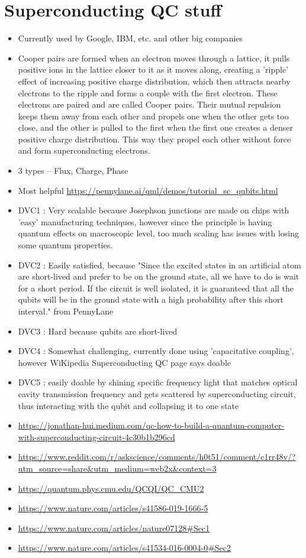 \section{Superconducting QC stuff}

\begin{itemize}
    \item Currently used by Google, IBM, etc. and other big companies
    \item Cooper pairs are formed when an electron moves through a lattice, it pulls positive ions in the lattice closer to it as it moves along, creating a 'ripple' effect of increasing positive charge distribution, which then attracts nearby electrons to the ripple and forms a couple with the first electron. These electrons are paired and are called Cooper pairs. Their mutual repulsion keeps them away from each other and propels one when the other gets too close, and the other is pulled to the first when the first one creates a denser positive charge distribution. This way they propel each other without force and form superconducting electrons. 
    \item 3 types – Flux, Charge, Phase
    \item Most helpful \url{https://pennylane.ai/qml/demos/tutorial_sc_qubits.html}
    \item DVC1 : Very scalable because Josephson junctions are made on chips with 'easy' manufacturing techniques, however since the principle is having quantum effects on macroscopic level, too much scaling has issues with losing some quantum properties.
    \item DVC2 : Easily satisfied, because "Since the excited states in an artificial atom are short-lived and prefer to be on the ground state, all we have to do is wait for a short period. If the circuit is well isolated, it is guaranteed that all the qubits will be in the ground state with a high probability after this short interval." from PennyLane
    \item DVC3 : Hard because qubits are short-lived
    \item DVC4 : Somewhat challenging, currently done using 'capacitative coupling', however WiKipedia Superconducting QC page says doable
    \item DVC5 : easily doable by shining specific frequency light that matches optical cavity transmission frequency and gets scattered by superconducting circuit, thus interacting with the qubit and collapsing it to one state
    \item 
    \url{https://jonathan-hui.medium.com/qc-how-to-build-a-quantum-computer-with-superconducting-circuit-4c30b1b296cd}
    \item 
    \url{https://www.reddit.com/r/askscience/comments/h0t51/comment/c1rr48v/?utm_source=share&utm_medium=web2x&context=3}
    \item \url{https://quantum.phys.cmu.edu/QCQI/QC_CMU2}
    \item \url{https://www.nature.com/articles/s41586-019-1666-5}
    \item \url{https://www.nature.com/articles/nature07128#Sec1}
    \item \url{https://www.nature.com/articles/s41534-016-0004-0#Sec2}

\end{itemize}